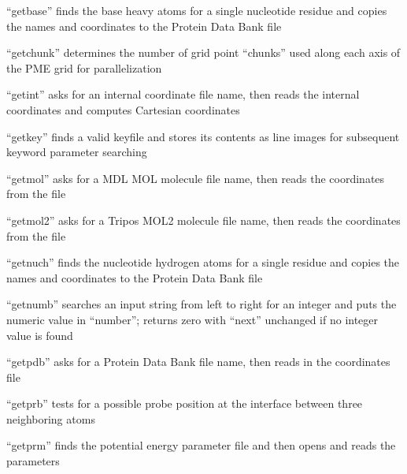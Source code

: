 \documentclass[letterpaper,11pt,english]{sphinxmanual}
\begin{document}

“getbase” finds the base heavy atoms for a single nucleotide
residue and copies the names and coordinates to the Protein
Data Bank file


“getchunk” determines the number of grid point “chunks” used
along each axis of the PME grid for parallelization


“getint” asks for an internal coordinate file name, then reads
the internal coordinates and computes Cartesian coordinates


“getkey” finds a valid keyfile and stores its contents as
line images for subsequent keyword parameter searching


“getmol” asks for a MDL MOL molecule file name,
then reads the coordinates from the file


“getmol2” asks for a Tripos MOL2 molecule file name,
then reads the coordinates from the file



“getnuch” finds the nucleotide hydrogen atoms for a single
residue and copies the names and coordinates to the Protein
Data Bank file


“getnumb” searches an input string from left to right for an
integer and puts the numeric value in “number”; returns zero
with “next” unchanged if no integer value is found


“getpdb” asks for a Protein Data Bank file name,
then reads in the coordinates file


“getprb” tests for a possible probe position at the interface
between three neighboring atoms


“getprm” finds the potential energy parameter file
and then opens and reads the parameters
\end{document}
